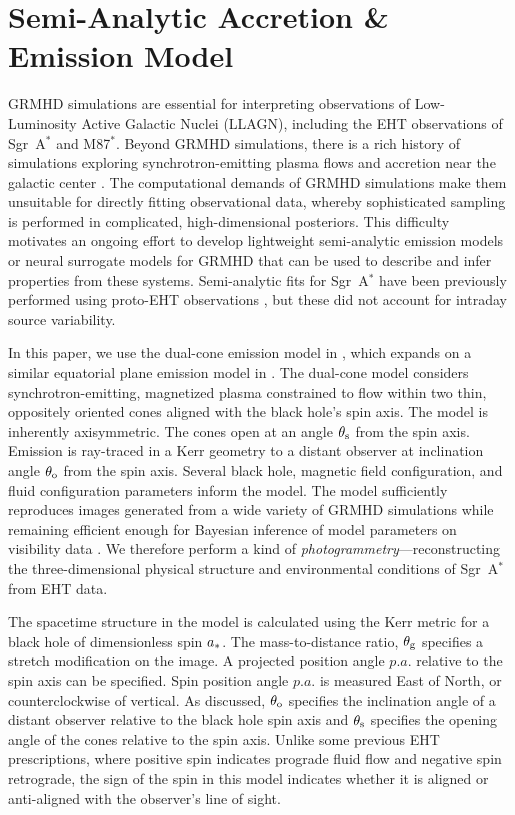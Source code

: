 \documentclass[linenumbers, twocolumn, tighten]{aastex701}
\def\sgra{Sgr~A$^*$\xspace}
\begin{document}
\section{Semi-Analytic Accretion \& Emission Model} \label{sec:model}

GRMHD simulations are essential for interpreting observations of Low-Luminosity Active Galactic Nuclei (LLAGN), including the EHT observations of \sgra and M87$^*$. Beyond GRMHD simulations, there is a rich history of simulations exploring synchrotron-emitting plasma flows and accretion near the galactic center \citep[][]{Yuan_2004, Broderick_2009,Dexter_2009,Broderick_2011,Pu_2016, ipole, EHT2022-V, Galishnikova_2023, Chan:2024bjg}. The computational demands of GRMHD simulations make them unsuitable for directly fitting observational data, whereby sophisticated sampling is performed in complicated, high-dimensional posteriors. 
This difficulty motivates an ongoing effort to develop lightweight semi-analytic emission models \citep[some examples include][]{Broderick_2016, Narayan2021,Papoutsis_2023} or neural surrogate models for GRMHD \citep[][]{Farah_2025, Franc} that can be used to describe and infer properties from these systems. 
Semi-analytic fits for \sgra have been previously performed using proto-EHT observations \citep[see, e.g.][]{Broderick_2016}, but these did not account for intraday source variability. 

In this paper, we use the dual-cone emission model in \citealt{Chang2024}, which expands on a similar equatorial plane emission model in \citealt{Palumbo2022}. The dual-cone model considers synchrotron-emitting, magnetized plasma constrained to flow within two thin, oppositely oriented cones aligned with the black hole's spin axis. 
The model is inherently axisymmetric. The cones open at an angle $\theta_{\rm s}$ from the spin axis. Emission is ray-traced in a Kerr geometry to a distant observer at inclination angle $\theta_{\rm o}$ from the spin axis. Several black hole, magnetic field configuration, and fluid configuration parameters inform the model. The model sufficiently reproduces images generated from a wide variety of GRMHD simulations while remaining efficient enough for Bayesian inference of model parameters on visibility data \citep{Chang2024}. We therefore perform a kind of \textit{photogrammetry}---reconstructing the three-dimensional physical structure and environmental conditions of \sgra from EHT data. 

The spacetime structure in the model is calculated using the Kerr metric for a black hole of dimensionless spin $a_{\rm *}$. 
The mass-to-distance ratio, $\theta_{\rm g}$ specifies a stretch modification on the image. 
A projected position angle $p.a.$ relative to the spin axis can be specified. 
Spin position angle $p.a.$ is measured East of North, or counterclockwise of vertical. As discussed, $\theta_{\rm o}$ specifies the inclination angle of a distant observer relative to the black hole spin axis and $\theta_{\rm s}$ specifies the opening angle of the cones relative to the spin axis. Unlike some previous EHT prescriptions, where positive spin indicates prograde fluid flow and negative spin retrograde, the sign of the spin in this model indicates whether it is aligned or anti-aligned with the observer's line of sight.
\end{document}
